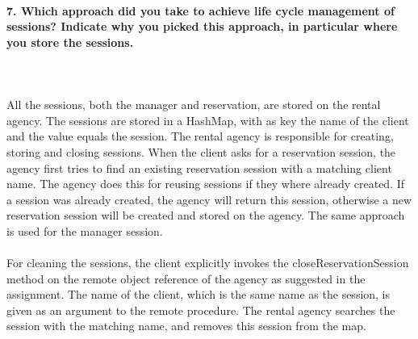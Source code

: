 \documentclass{ds-report}
\begin{document}
	\paragraph{7. Which approach did you take to achieve life cycle management of sessions? Indicate why you picked this approach, in particular where you store the sessions.} \mbox{}\\\\
All the sessions, both the manager and reservation, are stored on the rental agency. The sessions are stored in a HashMap, with as key the name of the client and the value equals the session. The rental agency is responsible for creating, storing and closing sessions. When the client asks for a reservation session, the agency first tries to find an existing reservation session with a matching client name. The agency does this for reusing sessions if they where already created. If a session was already created, the agency will return this session, otherwise a new reservation session will be created and stored on the agency. The same approach is used for the manager session.\\\\
For cleaning the sessions, the client explicitly invokes the closeReservationSession method on the remote object reference of the agency as suggested in the assignment. The name of the client, which is the same name as the session, is given as an argument to the remote procedure. The rental agency searches the session with the matching name, and removes this session from the map.

\clearpage
\end{document}
